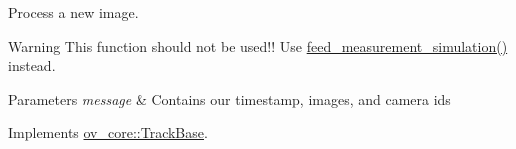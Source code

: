 Process a new image. 

\begin{DoxyWarning}{Warning}
This function should not be used!! Use \hyperlink{classov__core_1_1TrackSIM_a00388c410c804854c4c91e1a392d44e0}{feed\+\_\+measurement\+\_\+simulation()} instead. 
\end{DoxyWarning}

\begin{DoxyParams}{Parameters}
{\em message} & Contains our timestamp, images, and camera ids \\
\hline
\end{DoxyParams}


Implements \hyperlink{classov__core_1_1TrackBase_a18f208f4047e9a1955406806ba68a8c1}{ov\+\_\+core\+::\+Track\+Base}.

